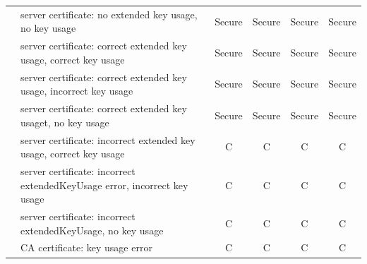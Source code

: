 \begin{table}[htbp]
\begin{tabular}{p{2.5cm}|p{8cm}|cccc}
                                                                                                    & server certificate: no extended key usage, no key usage                                           & Secure               & Secure               & Secure               & Secure               \\
                                                                                                    & server certificate: correct extended key usage, correct key usage                                     & Secure               & Secure               & Secure               & Secure               \\
                                                                                                    & server certificate: correct extended key usage, incorrect key usage                                     & Secure               & Secure               & Secure               & Secure               \\
                                                                                                    & server certificate: correct extended key usaget, no key usage                                       & Secure               & Secure               & Secure               & Secure               \\
                                                                                                    & server certificate: incorrect extended key usage, correct key usage                                     & C                    & C                    & C                    & C                    \\
                                                                                                    & server certificate: incorrect extendedKeyUsage error, incorrect key usage                                 & C                    & C                    & C                    & C                    \\
                                                                                                    & server certificate: incorrect extendedKeyUsage, no key usage                                          & C                    & C                    & C                    & C                    \\
                                                                                                    & CA certificate: key usage error                                                                     & C                    & C                    & C                    & C                    \\ \hline

\end{tabular}
\end{table}
